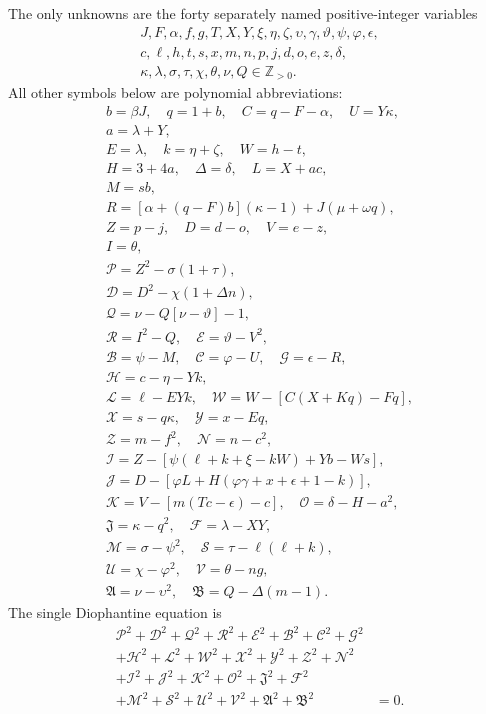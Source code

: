The only unknowns are the forty separately named positive-integer variables
\[
\begin{gathered}J,F,\alpha,f,g,T,X,Y,\xi,\eta,\zeta,\upsilon,\gamma,\vartheta,\psi,\varphi,\epsilon,\\
c,\ell,h,t,s,x,m,n,p,j,d,o,e,z,\delta,\\
\kappa,\lambda,\sigma,\tau,\chi,\theta,\nu,Q\in\mathbb Z_{>0}.\end{gathered}
\]
All other symbols below are polynomial abbreviations:
\[
\begin{gathered}
b=\beta J,\quad q=1+b,\quad C=q-F-\alpha,\quad U=Y\kappa,\\
a=\lambda+Y,\\
E=\lambda,\quad k=\eta+\zeta,\quad W=h-t,\\
H=3+4a,\quad\Delta=\delta,\quad L=X+ac,\\
M=sb,\\
R=[\alpha+(q-F)b](\kappa-1)+J(\mu+\omega q),\\
Z=p-j,\quad D=d-o,\quad V=e-z,\\
I=\theta,\\
\mathcal{P}=Z^2-\sigma(1+\tau),\\
\mathcal{D}=D^2-\chi(1+\Delta n),\\
\mathcal{Q}=\nu-Q[\nu-\vartheta]-1,\\
\mathcal{R}=I^2-Q,\quad \mathcal{E}=\vartheta-V^2,\\
\mathcal{B}=\psi-M,\quad \mathcal{C}=\varphi-U,\quad \mathcal{G}=\epsilon-R,\\
\mathcal{H}=c-\eta-Yk,\\
\mathcal{L}=\ell-EYk,\quad \mathcal{W}=W-[C(X+Kq)-Fq],\\
\mathcal{X}=s-q\kappa,\quad \mathcal{Y}=x-Eq,\\
\mathcal{Z}=m-f^2,\quad \mathcal{N}=n-c^2,\\
\mathcal{I}=Z-[\psi(\ell+k+\xi-kW)+Yb-Ws],\\
\mathcal{J}=D-[\varphi L+H(\varphi\gamma+x+\epsilon+1-k)],\\
\mathcal{K}=V-[m(Tc-\epsilon)-c],\quad\mathcal{O}=\delta-H-a^2,\\
\mathfrak{J}=\kappa-q^2,\quad\mathcal{F}=\lambda-XY,\\
\mathcal{M}=\sigma-\psi^2,\quad\mathcal{S}=\tau-\ell(\ell+k),\\
\mathcal{U}=\chi-\varphi^2,\quad\mathcal{V}=\theta-ng,\\
\mathfrak{A}=\nu-\upsilon^2,\quad\mathfrak{B}=Q-\Delta(m-1).
\end{gathered}
\]
The single Diophantine equation is
\[
\begin{split}
\mathcal{P}^2+\mathcal{D}^2+\mathcal{Q}^2+\mathcal{R}^2+\mathcal{E}^2+\mathcal{B}^2+\mathcal{C}^2+\mathcal{G}^2 &\\
+\mathcal{H}^2+\mathcal{L}^2+\mathcal{W}^2+\mathcal{X}^2+\mathcal{Y}^2+\mathcal{Z}^2+\mathcal{N}^2 &\\
+\mathcal{I}^2+\mathcal{J}^2+\mathcal{K}^2+\mathcal{O}^2+\mathfrak{J}^2+\mathcal{F}^2 &\\
+\mathcal{M}^2+\mathcal{S}^2+\mathcal{U}^2+\mathcal{V}^2+\mathfrak{A}^2+\mathfrak{B}^2 &= 0.
\end{split}
\]
